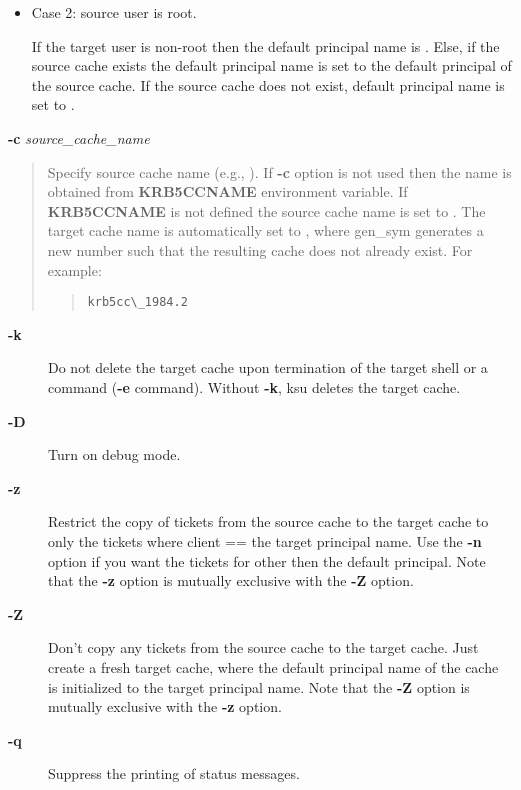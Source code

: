 \documentclass[letterpaper,10pt,english]{sphinxmanual}
\begin{document}
\begin{description}
\begin{itemize}
\item {} 
Case 2: source user is root.

If the target user is non-root then the default principal name
is .  Else, if the source cache
exists the default principal name is set to the default
principal of the source cache.  If the source cache does not
exist, default principal name is set to .

\end{itemize}

\end{description}

\textbf{-c} \emph{source\_cache\_name}
\begin{quote}

Specify source cache name (e.g., ).  If
\textbf{-c} option is not used then the name is obtained from
\textbf{KRB5CCNAME} environment variable.  If \textbf{KRB5CCNAME} is not
defined the source cache name is set to .
The target cache name is automatically set to , where gen\_sym generates a new number such that
the resulting cache does not already exist.  For example:
\begin{quote}

\begin{Verbatim}[commandchars=\\\{\}]
krb5cc\_1984.2
\end{Verbatim}
\end{quote}
\end{quote}
\begin{description}
\item[{\textbf{-k}}] \leavevmode
Do not delete the target cache upon termination of the target
shell or a command (\textbf{-e} command).  Without \textbf{-k}, ksu deletes
the target cache.

\item[{\textbf{-D}}] \leavevmode
Turn on debug mode.

\item[{\textbf{-z}}] \leavevmode
Restrict the copy of tickets from the source cache to the target
cache to only the tickets where client == the target principal
name.  Use the \textbf{-n} option if you want the tickets for other then
the default principal.  Note that the \textbf{-z} option is mutually
exclusive with the \textbf{-Z} option.

\item[{\textbf{-Z}}] \leavevmode
Don't copy any tickets from the source cache to the target cache.
Just create a fresh target cache, where the default principal name
of the cache is initialized to the target principal name.  Note
that the \textbf{-Z} option is mutually exclusive with the \textbf{-z}
option.

\item[{\textbf{-q}}] \leavevmode
Suppress the printing of status messages.

\end{description}
\end{document}
